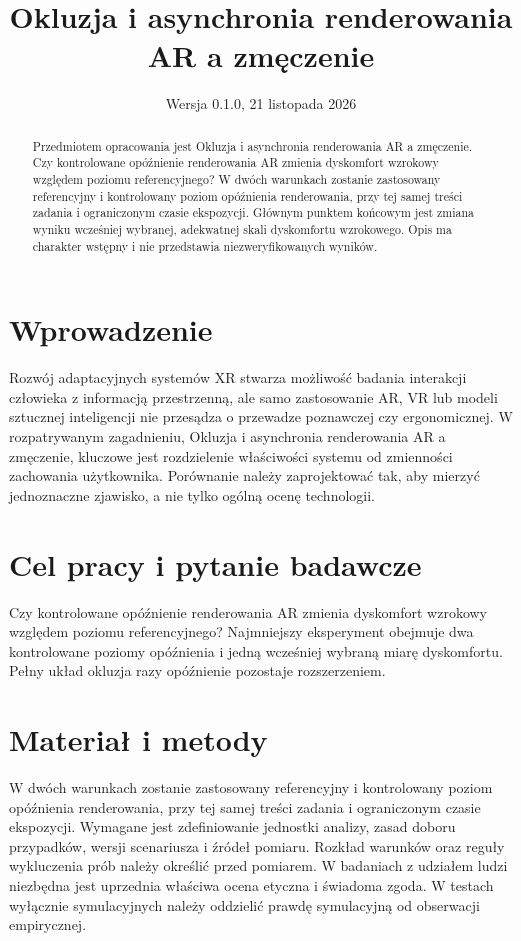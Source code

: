 \documentclass[11pt,a4paper]{article}
\title{Okluzja i asynchronia renderowania AR a zmęczenie}
\author{}
\date{Wersja 0.1.0, 21 listopada 2026}
\begin{document}
\maketitle

\begin{abstract}

Przedmiotem opracowania jest Okluzja i asynchronia renderowania AR a zmęczenie. Czy kontrolowane opóźnienie renderowania AR zmienia dyskomfort wzrokowy względem poziomu referencyjnego? W dwóch warunkach zostanie zastosowany referencyjny i kontrolowany poziom opóźnienia renderowania, przy tej samej treści zadania i ograniczonym czasie ekspozycji. Głównym punktem końcowym jest zmiana wyniku wcześniej wybranej, adekwatnej skali dyskomfortu wzrokowego. Opis ma charakter wstępny i nie przedstawia niezweryfikowanych wyników.

\end{abstract}

\section{Wprowadzenie}

Rozwój adaptacyjnych systemów XR stwarza możliwość badania interakcji człowieka z informacją przestrzenną, ale samo zastosowanie AR, VR lub modeli sztucznej inteligencji nie przesądza o przewadze poznawczej czy ergonomicznej. W rozpatrywanym zagadnieniu, Okluzja i asynchronia renderowania AR a zmęczenie, kluczowe jest rozdzielenie właściwości systemu od zmienności zachowania użytkownika. Porównanie należy zaprojektować tak, aby mierzyć jednoznaczne zjawisko, a nie tylko ogólną ocenę technologii.

\section{Cel pracy i pytanie badawcze}

Czy kontrolowane opóźnienie renderowania AR zmienia dyskomfort wzrokowy względem poziomu referencyjnego? Najmniejszy eksperyment obejmuje dwa kontrolowane poziomy opóźnienia i jedną wcześniej wybraną miarę dyskomfortu. Pełny układ okluzja razy opóźnienie pozostaje rozszerzeniem.

\section{Materiał i metody}

W dwóch warunkach zostanie zastosowany referencyjny i kontrolowany poziom opóźnienia renderowania, przy tej samej treści zadania i ograniczonym czasie ekspozycji. Wymagane jest zdefiniowanie jednostki analizy, zasad doboru przypadków, wersji scenariusza i źródeł pomiaru. Rozkład warunków oraz reguły wykluczenia prób należy określić przed pomiarem. W badaniach z udziałem ludzi niezbędna jest uprzednia właściwa ocena etyczna i świadoma zgoda. W testach wyłącznie symulacyjnych należy oddzielić prawdę symulacyjną od obserwacji empirycznej.
\end{document}
